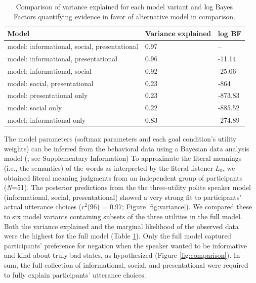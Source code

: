 \documentclass[9pt,twocolumn,twoside,lineno]{main_class_file}
\begin{document}
\begin{table}[tbp]
\begin{center}
\begin{threeparttable}
\caption{\label{tab:comparisonTable}Comparison of variance explained for each model variant and log Bayes Factors quantifying evidence in favor of alternative model in comparison.}
\begin{tabular}{lll}
\toprule
Model & \multicolumn{1}{c}{Variance 
explained} & \multicolumn{1}{c}{log BF}\\
\midrule
model: 
informational, 
social, 
presentational & 0.97 & --\\
model: 
informational, 
presentational & 0.96 & -11.14\\
model: 
informational, 
social & 0.92 & -25.06\\
model: 
social, 
presentational & 0.23 & -864\\
model: 
presentational 
only & 0.23 & -873.83\\
model: 
social only & 0.22 & -885.52\\
model: 
informational 
only & 0.83 & -274.89\\
\bottomrule
\end{tabular}
\end{threeparttable}
\end{center}
\end{table}
The model parameters (softmax parameters and each goal condition's utility weights) can be inferred from the behavioral data using a Bayesian data analysis model (\cite{lee2014}; see Supplementary Information)
To approximate the literal meanings (i.e., the semantics) of the words as interpreted by the literal listener \(L_0\), we obtained literal meaning judgments from an independent group of participants
(\emph{N}=51). 
The posterior predictions from the the three-utility polite speaker model (informational, social, presentational) showed a very strong fit to participants' actual utterance choices (\(r^2\)(96) = 0.97; Figure \ref{fig:variance}).
We compared these to six model variants containing
subsets of the three utilities in the full model.
Both the variance explained and the marginal likelihood of the observed data were the
highest for the full model (Table \ref{tab:comparisonTable}). Only the
full model captured participants' preference for negation when the speaker wanted to be informative and kind
about truly bad states, as hypothesized (Figure \ref{fig:comparison}).
In sum, the full collection of informational, social, and presentational were
required to fully explain participants' utterance choices.
\end{document}

